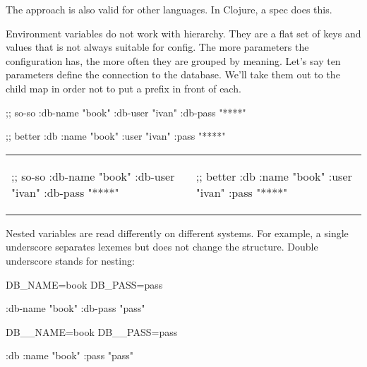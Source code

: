 The approach is also valid for other languages. In Clojure, a spec does this.

Environment variables do not work with hierarchy. They are a flat set of keys and values that is not always suitable for config. The more parameters the configuration has, the more often they are grouped by meaning. Let's say ten parameters define the connection to the database. We'll take them out to the child map in order not to put a prefix in front of each.


\ifx\DEVICETYPE\MOBILE

\begin{english}
  \begin{clojure}
;; so-so
{:db-name "book"
 :db-user "ivan"
 :db-pass "****"}
  \end{clojure}

\splitter

  \begin{clojure}
;; better
{:db {:name "book"
      :user "ivan"
      :pass "****"}}
  \end{clojure}
\end{english}

\else

\begin{english}

\noindent
\begin{tabular}{ @{}p{5cm} @{}p{5cm} }

  \begin{clojure}
;; so-so
{:db-name "book"
 :db-user "ivan"
 :db-pass "****"}
  \end{clojure}

&

  \begin{clojure}
;; better
{:db {:name "book"
      :user "ivan"
      :pass "****"}}
  \end{clojure}

\end{tabular}

\end{english}

\fi

Nested variables are read differently on different systems. For example, a single underscore separates lexemes but does not change the structure. Double underscore stands for nesting:

\ifx\DEVICETYPE\MOBILE

\begin{english}
  \begin{clojure}
DB_NAME=book
DB_PASS=pass

{:db-name "book"
 :db-pass "pass"}
  \end{clojure}

\splitter

  \begin{clojure}
DB__NAME=book
DB__PASS=pass

{:db {:name "book"
      :pass "pass"}}
  \end{clojure}
\end{english}

